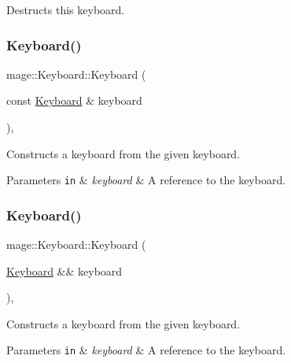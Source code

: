 Destructs this keyboard. \hypertarget{classmage_1_1_keyboard_a39d07f8a5e37648ca9eba30aa55146bf}{}\label{classmage_1_1_keyboard_a39d07f8a5e37648ca9eba30aa55146bf} 
\subsubsection{\texorpdfstring{Keyboard()}{Keyboard()}\hspace{0.1cm}{\footnotesize\ttfamily [2/3]}}
{\footnotesize\ttfamily mage\+::\+Keyboard\+::\+Keyboard (\begin{DoxyParamCaption}\item[{const \hyperlink{classmage_1_1_keyboard}{Keyboard} \&}]{keyboard }\end{DoxyParamCaption})\hspace{0.3cm}{\ttfamily [private]}, {\ttfamily [delete]}}

Constructs a keyboard from the given keyboard.


\begin{DoxyParams}[1]{Parameters}
\mbox{\tt in}  & {\em keyboard} & A reference to the keyboard. \\
\hline
\end{DoxyParams}
\hypertarget{classmage_1_1_keyboard_a6ed1e7732253b4d7e4e0bf9ca5a6f108}{}\label{classmage_1_1_keyboard_a6ed1e7732253b4d7e4e0bf9ca5a6f108} 
\subsubsection{\texorpdfstring{Keyboard()}{Keyboard()}\hspace{0.1cm}{\footnotesize\ttfamily [3/3]}}
{\footnotesize\ttfamily mage\+::\+Keyboard\+::\+Keyboard (\begin{DoxyParamCaption}\item[{\hyperlink{classmage_1_1_keyboard}{Keyboard} \&\&}]{keyboard }\end{DoxyParamCaption})\hspace{0.3cm}{\ttfamily [private]}, {\ttfamily [delete]}}

Constructs a keyboard from the given keyboard.


\begin{DoxyParams}[1]{Parameters}
\mbox{\tt in}  & {\em keyboard} & A reference to the keyboard. \\
\hline
\end{DoxyParams}


